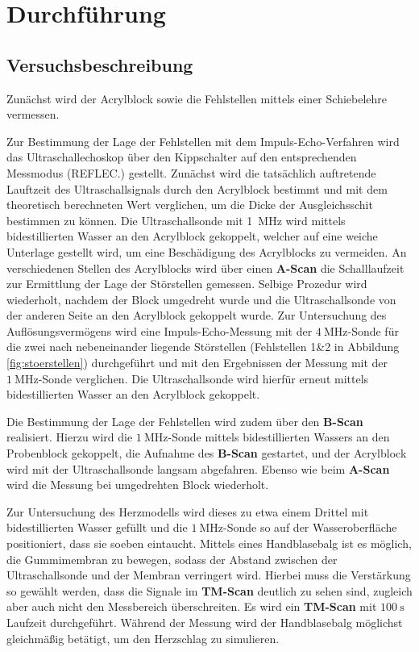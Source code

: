 \section{Durchführung}
\label{sec:Durchführung}



\subsection{Versuchsbeschreibung}
\label{sec:Versuchsbeschreibung}
Zunächst wird der Acrylblock sowie die Fehlstellen mittels einer Schiebelehre vermessen.

Zur Bestimmung der Lage der Fehlstellen mit dem Impuls-Echo-Verfahren wird das Ultraschallechoskop über den Kippschalter auf den entsprechenden Messmodus (REFLEC.) gestellt.
Zunächst wird die tatsächlich auftretende Lauftzeit des Ultraschallsignals durch den Acrylblock bestimmt und mit dem theoretisch berechneten Wert verglichen, um die Dicke der Ausgleichsschit bestimmen zu können.
Die Ultraschallsonde mit \SI{1}{\mega\Hz} wird mittels bidestillierten Wasser an den Acrylblock gekoppelt, welcher auf eine weiche Unterlage gestellt wird, um eine Beschädigung des Acrylblocks zu vermeiden.
An verschiedenen Stellen des Acrylblocks wird über einen \textbf{A-Scan} die Schalllaufzeit zur Ermittlung der Lage der Störstellen gemessen. Selbige Prozedur wird wiederholt, nachdem der Block umgedreht wurde und die Ultraschallsonde von der anderen Seite an den Acrylblock gekoppelt wurde.
Zur Untersuchung des Auflösungsvermögens wird eine Impuls-Echo-Messung mit der $\SI{4}{\mega\Hz}$-Sonde für die zwei nach nebeneinander liegende Störstellen (Fehlstellen 1\&2 in Abbildung \ref{fig:stoerstellen}) durchgeführt und mit den Ergebnissen der Messung mit der $\SI{1}{\mega\Hz}$-Sonde verglichen.
Die Ultraschallsonde wird hierfür erneut mittels bidestillierten Wasser an den Acrylblock gekoppelt.

Die Bestimmung der Lage der Fehlstellen wird zudem über den \textbf{B-Scan} realisiert. Hierzu wird die $\SI{1}{\mega\Hz}$-Sonde mittels bidestillierten Wassers an den Probenblock gekoppelt, die Aufnahme des \textbf{B-Scan} gestartet, und der Acrylblock wird mit der Ultraschallsonde langsam abgefahren.
Ebenso wie beim \textbf{A-Scan} wird die Messung bei umgedrehten Block wiederholt.

Zur Untersuchung des Herzmodells wird dieses zu etwa einem Drittel mit bidestillierten Wasser gefüllt und die $\SI{1}{\mega\Hz}$-Sonde so auf der Wasseroberfläche positioniert, dass sie soeben eintaucht. Mittels eines Handblasebalg ist es möglich, die Gummimembran zu bewegen, sodass der Abstand zwischen der Ultraschallsonde und der Membran verringert wird. Hierbei muss die Verstärkung so gewählt werden, dass die Signale im \textbf{TM-Scan} deutlich zu sehen sind, zugleich aber auch nicht den Messbereich überschreiten.
Es wird ein \textbf{TM-Scan} mit $\SI{100}{\second}$ Laufzeit durchgeführt. Während der Messung wird der Handblasebalg möglichst gleichmäßig betätigt, um den Herzschlag zu simulieren.
